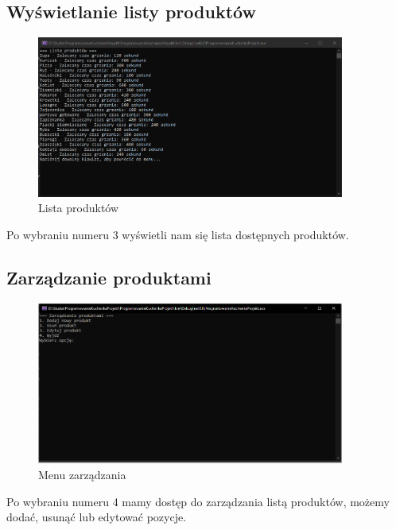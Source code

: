 \subsection{Wyświetlanie listy produktów}
\begin{figure}[h]
    \centering
    \includegraphics[width=0.9\textwidth]{Menu4.png}
      \caption{Lista produktów}
    \label{fig:example}
\end{figure}

Po wybraniu numeru 3 wyświetli nam się lista dostępnych produktów. 

\newpage

\subsection{Zarządzanie produktami}


\begin{figure}[h]
    \centering
    \includegraphics[width=0.9\textwidth]{Menu5.png}
      \caption{Menu zarządzania}
    \label{fig:example}
\end{figure}

Po wybraniu numeru 4 mamy dostęp do zarządzania listą produktów, możemy dodać, usunąć lub edytować pozycje.

